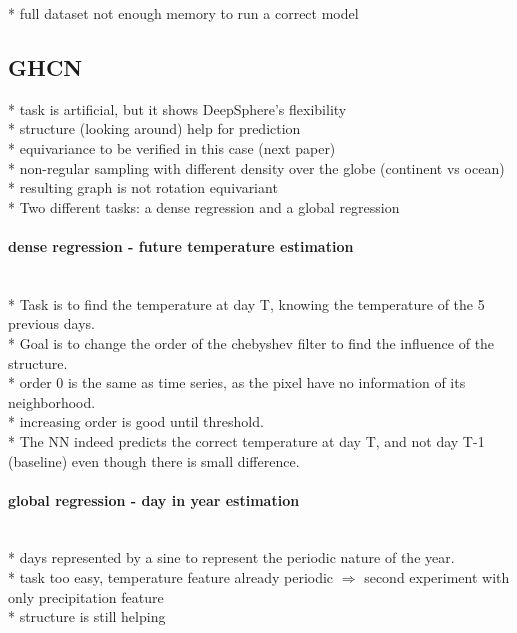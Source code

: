 \documentclass{article} %
\begin{document}
* full dataset not enough memory to run a correct model


\subsection{GHCN} \label{sec:exp:ghcn}

* task is artificial, but it shows DeepSphere's flexibility\\
* structure (looking around) help for prediction\\
* equivariance to be verified in this case (next paper)\\

* non-regular sampling with different density over the globe (continent vs ocean)\\
* resulting graph is not rotation equivariant\\
* Two different tasks: a dense regression and a global regression\\

\paragraph*{dense regression - future temperature estimation}~\\
* Task is to find the temperature at day T, knowing the temperature of the 5 previous days.\\
* Goal is to change the order of the chebyshev filter to find the influence of the structure.\\
* order 0 is the same as time series, as the pixel have no information of its neighborhood.\\
* increasing order is good until threshold.\\
* The NN indeed predicts the correct temperature at day T, and not day T-1 (baseline) even though there is small difference.\\



\paragraph*{global regression - day in year estimation}~\\
* days represented by a sine to represent the periodic nature of the year.\\
* task too easy, temperature feature already periodic $\Rightarrow$ second experiment with only precipitation feature\\
* structure is still helping\\
\end{document}

